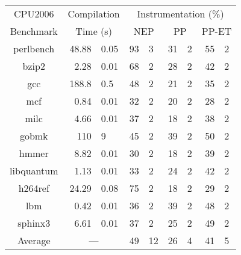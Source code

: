 
\begin{tabular}{|c|r@{$\pm$}l|r@{$\pm$}l|r@{$\pm$}l|r@{$\pm$}l|}	\hline 
CPU2006   & \multicolumn{2}{|c|}{Compilation}
          & \multicolumn{6}{c|}{Instrumentation (\%)} \\ \cline{4-9} 
Benchmark & \multicolumn{2}{|c|}{Time (s)} 
          & \multicolumn{2}{c|}{NEP} 
          & \multicolumn{2}{c|}{PP} 
          & \multicolumn{2}{c|}{PP-ET} \\ \hline \hline 
perlbench   & 48.88&0.05 & 93&3  & 31&2 & 55&2 \\ \hline
bzip2       & 2.28&0.01  & 68&2  & 28&2 & 42&2 \\	\hline 
gcc         & 188.8&0.5  & 48&2  & 21&2 & 35&2 \\	\hline 
mcf         & 0.84&0.01  & 32&2  & 20&2 & 28&2 \\	\hline 
milc        & 4.66&0.01  & 37&2  & 18&2 & 38&2 \\	\hline 
gobmk       & 110&9      & 45&2  & 39&2 & 50&2 \\	\hline 
hmmer       & 8.82&0.01  & 30&2  & 18&2 & 39&2 \\	\hline 
libquantum  & 1.13&0.01  & 33&2  & 24&2 & 42&2 \\	\hline 
h264ref     & 24.29&0.08 & 75&2  & 18&2 & 29&2 \\	\hline 
lbm         & 0.42&0.01  & 36&2  & 39&2 & 48&2 \\	\hline 
sphinx3     & 6.61&0.01  & 37&2  & 25&2 & 49&2 \\ \hline \hline 
Average     & \multicolumn{2}{|c|}{---} & 49&12 & 26&4 & 41&5 \\ \hline
\end{tabular}
